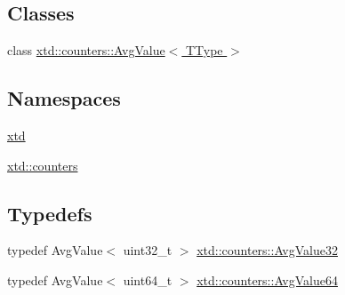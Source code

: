 \subsection*{Classes}
\begin{DoxyCompactItemize}
\item 
class \hyperlink{classxtd_1_1counters_1_1AvgValue}{xtd\-::counters\-::\-Avg\-Value$<$ T\-Type $>$}
\end{DoxyCompactItemize}
\subsection*{Namespaces}
\begin{DoxyCompactItemize}
\item 
\hyperlink{namespacextd}{xtd}
\item 
\hyperlink{namespacextd_1_1counters}{xtd\-::counters}
\end{DoxyCompactItemize}
\subsection*{Typedefs}
\begin{DoxyCompactItemize}
\item 
typedef Avg\-Value$<$ uint32\-\_\-t $>$ \hyperlink{namespacextd_1_1counters_a162dd5cde0e6fcc970c543f7420b4c14}{xtd\-::counters\-::\-Avg\-Value32}
\item 
typedef Avg\-Value$<$ uint64\-\_\-t $>$ \hyperlink{namespacextd_1_1counters_aa43118623f65cdf1ba43bffd8f17ea0e}{xtd\-::counters\-::\-Avg\-Value64}
\end{DoxyCompactItemize}
